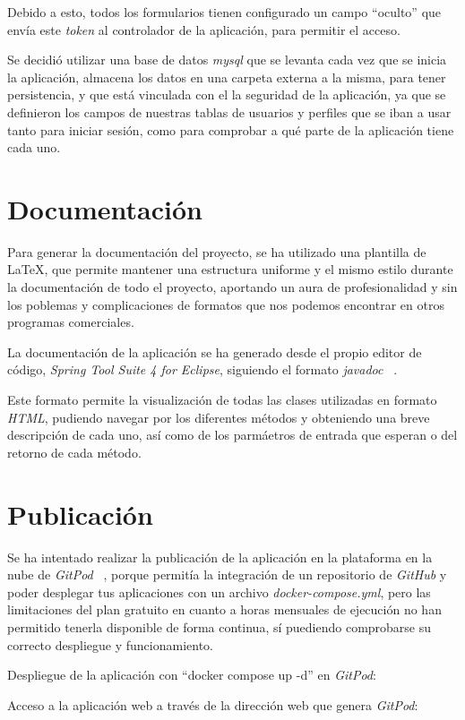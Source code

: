 Debido a esto, todos los formularios tienen configurado un campo ``oculto'' que envía este \textit{token} al controlador de la aplicación, para permitir el acceso.

Se decidió utilizar una base de datos \textit{mysql} que se levanta cada vez que se inicia la aplicación, almacena los datos en una carpeta externa a la misma, para tener persistencia, y que está vinculada con el la seguridad de la aplicación, ya que se definieron los campos de nuestras tablas de usuarios y perfiles que se iban a usar tanto para iniciar sesión, como para comprobar a qué parte de la aplicación tiene cada uno.

\section{Documentación}

Para generar la documentación del proyecto, se ha utilizado una plantilla de \LaTeX, que permite mantener una estructura uniforme y el mismo estilo durante la documentación de todo el proyecto, aportando un aura de profesionalidad y sin los poblemas y complicaciones de formatos que nos podemos encontrar en otros programas comerciales.

La documentación de la aplicación se ha generado desde el propio editor de código, \textit{Spring Tool Suite 4 for Eclipse}, siguiendo el formato \textit{javadoc} ~\cite{doc:javadoc}.

Este formato permite la visualización de todas las clases utilizadas en formato \textit{HTML}, pudiendo navegar por los diferentes métodos y obteniendo una breve descripción de cada uno, así como de los parmáetros de entrada que esperan o del retorno de cada método.
\clearpage
\section{Publicación}

Se ha intentado realizar la publicación de la aplicación en la plataforma en la nube de \textit{GitPod} ~\cite{doc:gitpod}, porque permitía la integración de un repositorio de \textit{GitHub} y poder desplegar tus aplicaciones con un archivo \textit{docker-compose.yml}, pero las limitaciones del plan gratuito en cuanto a horas mensuales de ejecución no han permitido tenerla disponible de forma continua, sí puediendo comprobarse su correcto despliegue y funcionamiento.

Despliegue de la aplicación con ``docker compose up -d'' en \textit{GitPod}:

Acceso a la aplicación web a través de la dirección web que genera \textit{GitPod}:




